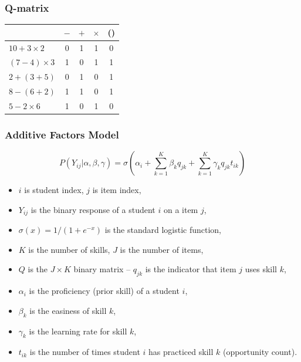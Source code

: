 \documentclass[bigger]{beamer}
\begin{document}
\begin{frame}
  \frametitle{Q-matrix}

  \begin{center}
      \begin{tabular}{lcccc}
    \toprule
    & $-$ & $+$ & $\times$ & () \\
    \midrule
    $10+3\times 2$ & 0 & 1 &  1 & 0 \\
    $(7-4)\times 3$ & 1 & 0 & 1 & 1 \\
    $2+ (3 + 5)$ & 0 & 1 & 0 & 1 \\
    $8-(6+2)$ & 1 & 1 & 0 & 1 \\
    $5-2\times 6$ & 1 & 0 &  1 & 0 \\
    \bottomrule
  \end{tabular}
  \end{center}
\end{frame}


\begin{frame}
  \frametitle{Additive Factors Model}

  \[ P(Y_{ij}|\alpha, \beta, \gamma) = \sigma\left(\alpha_i + \sum_{k=1}^K
    \beta_k q_{jk} + \sum_{k=1}^K \gamma_k q_{jk} t_{ik}\right) \]

\begin{itemize}
\item $i$ is student index, $j$ is item index,
\item $Y_{ij}$ is the binary response of a student $i$ on a item $j$,
\item $\sigma(x) = 1 / (1 + e^{-x})$ is the standard logistic function,
\item $K$ is the number of skills, $J$ is the number of items,
\item $Q$ is the $J\times K$ binary matrix -- $q_{jk}$ is the indicator that
  item $j$ uses skill $k$,
\item $\alpha_i$ is the proficiency (prior skill) of a student $i$,
\item $\beta_k$ is the easiness of skill $k$,
\item $\gamma_k$ is the learning rate for skill $k$,
\item $t_{ik}$ is the number of times student $i$ has practiced skill $k$
  (opportunity count).
\end{itemize}
\end{frame}
\end{document}
